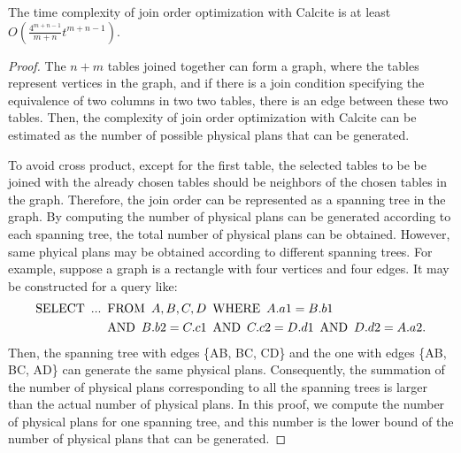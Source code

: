 \begin{theorem}
    \label{theorem:complexity-of-calcite}
    The time complexity of join order optimization with Calcite is at least $O(\frac{4^{m+n-1}}{m+n}t^{m+n-1})$.
\end{theorem}
\begin{proof}
    The $n + m$ tables joined together can form a graph, where the tables represent vertices in the graph, and if there is a join condition specifying the equivalence of two columns in two two tables, there is an edge between these two tables.
    Then, the complexity of join order optimization with Calcite can be estimated as the number of possible physical plans that can be generated.
    
    To avoid cross product, except for the first table, the selected tables to be be joined with the already chosen tables should be neighbors of the chosen tables in the graph.
    Therefore, the join order can be represented as a spanning tree in the graph.
    By computing the number of physical plans can be generated according to each spanning tree, the total number of physical plans can be obtained.
    However, same phyical plans may be obtained according to different spanning trees.
    For example, suppose a graph is a rectangle with four vertices and four edges.
    It may be constructed for a query like:
    \begin{equation*}
        \begin{split}
            \text{SELECT}\hspace{.5em} ... & \hspace{.5em}\text{FROM}\hspace{.5em} A, B, C, D \hspace{.5em}\text{WHERE}\hspace{.5em} A.a1 = B.b1 \\ 
            & \hspace{.5em}\text{AND}\hspace{.5em} B.b2 = C.c1 \hspace{.5em}\text{AND}\hspace{.5em} C.c2 = D.d1 \hspace{.5em}\text{AND}\hspace{.5em} D.d2 = A.a2. 
        \end{split}
    \end{equation*}
    Then, the spanning tree with edges \{AB, BC, CD\} and the one with edges \{AB, BC, AD\} can generate the same physical plans.
    Consequently, the summation of the number of physical plans corresponding to all the spanning trees is larger than the actual number of physical plans.
    In this proof, we compute the number of physical plans for one spanning tree, and this number is the lower bound of the number of physical plans that can be generated.


\end{proof}
